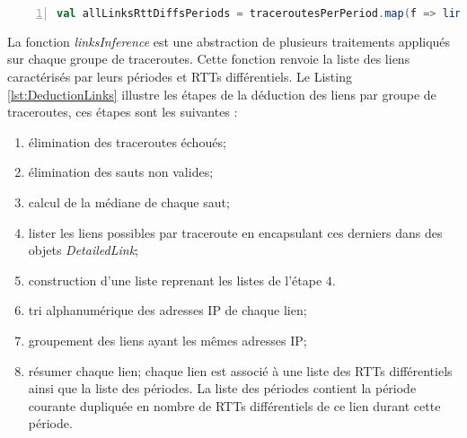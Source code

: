 \begin{lstlisting}[language=scala,firstnumber=1, caption={La classe TracerouteWithPeriod },label={lst:linkInference}, basicstyle = \footnotesize,escapechar=|,numbers=left,
stepnumber=1]
val allLinksRttDiffsPeriods = traceroutesPerPeriod.map(f => linksInference(spark, f))
\end{lstlisting}

La fonction \textit{linksInference} est une abstraction de plusieurs traitements appliqués sur chaque groupe de traceroutes.  Cette fonction renvoie
la liste des liens caractérisés par leurs périodes et RTTs différentiels. Le Listing \ref{lst:DeductionLinks}
illustre les étapes de la déduction des liens par groupe de traceroutes, ces étapes sont les suivantes : 

\begin{enumerate}
	\item élimination des traceroutes échoués;
	\item élimination des sauts non valides;
	\item calcul de la médiane de chaque saut;
	\item lister les liens possibles par traceroute en encapsulant ces derniers dans des objets \textit{DetailedLink};
	\item construction d'une liste reprenant les listes de l'étape $4$.
	\item tri alphanumérique des adresses IP de chaque lien;
	\item groupement des liens ayant les mêmes adresses IP;
	\item résumer chaque lien; chaque lien est associé à une liste des RTTs différentiels ainsi que la liste des périodes. La liste des périodes contient la période courante dupliquée en nombre de RTTs différentiels de ce lien durant cette période. 
\end{enumerate}


